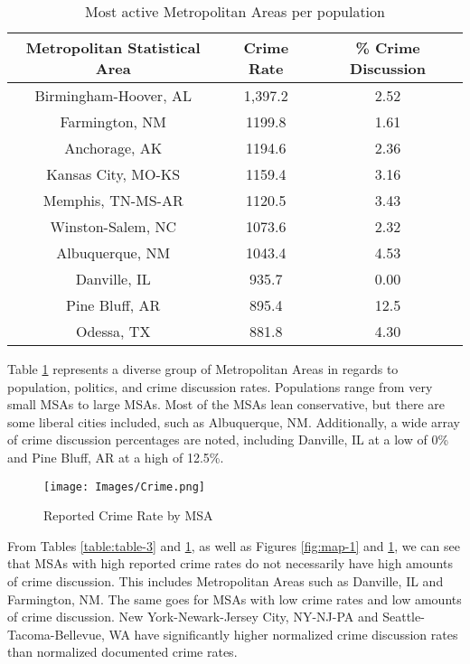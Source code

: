 \documentclass[12pt,oneside, letterpaper]{book}
\begin{document}
\begin{table}[h!]
    \centering
    \small
    \caption{Most active Metropolitan Areas per population}
    \begin{tabular}{| c | c | c |}
    \hline
    Metropolitan Statistical Area & Crime Rate & \% Crime Discussion\\ \hline
    Birmingham-Hoover, AL & 1,397.2 & 2.52 \\ \hline
    Farmington, NM & 1199.8 & 1.61 \\ \hline
    Anchorage, AK & 1194.6 & 2.36 \\ \hline
    Kansas City, MO-KS & 1159.4 & 3.16 \\ \hline
    Memphis, TN-MS-AR & 1120.5 & 3.43 \\ \hline
    Winston-Salem, NC & 1073.6 & 2.32 \\ \hline
    Albuquerque, NM & 1043.4 & 4.53 \\ \hline
    Danville, IL & 935.7 & 0.00 \\ \hline
    Pine Bluff, AR & 895.4 & 12.5 \\ \hline
    Odessa, TX & 881.8 & 4.30 \\ \hline
	\end{tabular}
	\label{table:table-4}
\end{table}

\par Table \ref{table:table-4} represents a diverse group of Metropolitan Areas in regards to population, politics, and crime discussion rates. Populations range from very small MSAs to large MSAs. Most of the MSAs lean conservative, but there are some liberal cities included, such as Albuquerque, NM. Additionally, a wide array of crime discussion percentages are noted, including Danville, IL at a low of 0\% and Pine Bluff, AR at a high of 12.5\%.

\begin{figure}[ht]
    \centering
    \texttt{[image: Images/Crime.png]}
    \caption{Reported Crime Rate by MSA}
    \label{fig:map-3}
\end{figure}

\par From Tables \ref{table:table-3} and \ref{table:table-4}, as well as Figures \ref{fig:map-1} and \ref{fig:map-3}, we can see that MSAs with high reported crime rates do not necessarily have high amounts of crime discussion. This includes Metropolitan Areas such as Danville, IL and Farmington, NM. The same goes for MSAs with low crime rates and low amounts of crime discussion. New York-Newark-Jersey City, NY-NJ-PA and Seattle-Tacoma-Bellevue, WA have significantly higher normalized crime discussion rates than normalized documented crime rates.
\end{document}
